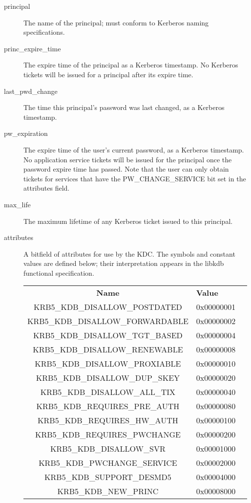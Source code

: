 \begin{description}
\item[principal] The name of the principal; must conform to Kerberos
naming specifications.

\item[princ_expire_time] The expire time of the principal as a Kerberos
timestamp.  No Kerberos tickets will be issued for a principal after
its expire time.

\item[last_pwd_change] The time this principal's password was last
changed, as a Kerberos timestamp.

\item[pw_expiration] The expire time of the user's current password, as a
Kerberos timestamp.  No application service tickets will be issued for the
principal once the password expire time has passed.  Note that the user can
only obtain tickets for services that have the PW_CHANGE_SERVICE bit set in
the attributes field.

\item[max_life] The maximum lifetime of any Kerberos ticket issued to
this principal.

\item[attributes] A bitfield of attributes for use by the KDC.  The
symbols and constant values are defined below; their interpretation
appears in the libkdb functional specification.

\begin{tabular}{clr}
{\bf Name} & {\bf Value} \\
KRB5_KDB_DISALLOW_POSTDATED     & 0x00000001 \\
KRB5_KDB_DISALLOW_FORWARDABLE   & 0x00000002 \\
KRB5_KDB_DISALLOW_TGT_BASED     & 0x00000004 \\
KRB5_KDB_DISALLOW_RENEWABLE     & 0x00000008 \\
KRB5_KDB_DISALLOW_PROXIABLE     & 0x00000010 \\
KRB5_KDB_DISALLOW_DUP_SKEY      & 0x00000020 \\
KRB5_KDB_DISALLOW_ALL_TIX       & 0x00000040 \\
KRB5_KDB_REQUIRES_PRE_AUTH      & 0x00000080 \\
KRB5_KDB_REQUIRES_HW_AUTH       & 0x00000100 \\
KRB5_KDB_REQUIRES_PWCHANGE      & 0x00000200 \\
KRB5_KDB_DISALLOW_SVR           & 0x00001000 \\
KRB5_KDB_PWCHANGE_SERVICE       & 0x00002000 \\
KRB5_KDB_SUPPORT_DESMD5         & 0x00004000 \\
KRB5_KDB_NEW_PRINC              & 0x00008000
\end{tabular}


\end{description}
